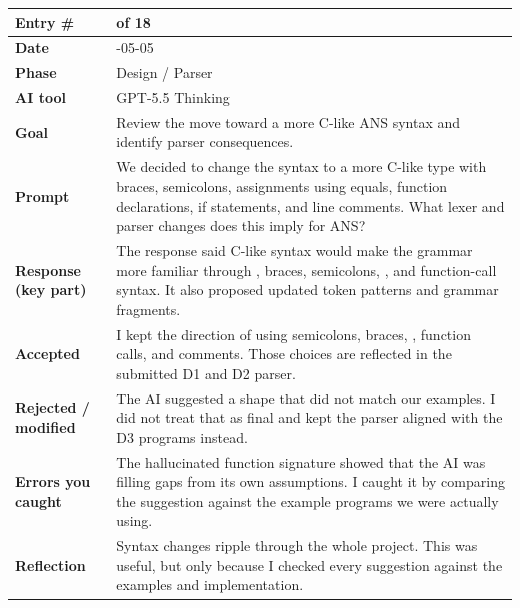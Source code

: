 \documentclass[11pt,a4paper]{article}
\newcommand{\code}[1]{\texttt{\detokenize{#1}}}
\newcommand{\entrygap}{\vspace{8pt}}
\newenvironment{journalentry}{%
  \begin{center}\small\renewcommand{\arraystretch}{1.22}%
  \begin{tabular}{|>{\columncolor{anscodebg}\bfseries}p{3.0cm}|>{\RaggedRight\arraybackslash}p{12.25cm}|}%
  \hline
}{%
  \end{tabular}\end{center}\entrygap
}
\begin{document}
\begin{journalentry}
Entry \# & 5 of 18 \\ \hline
Date & 2026-05-05 \\ \hline
Phase & Design / Parser \\ \hline
AI tool & GPT-5.5 Thinking \\ \hline
Goal & Review the move toward a more C-like ANS syntax and identify parser consequences. \\ \hline
Prompt & We decided to change the syntax to a more C-like type with braces, semicolons, assignments using equals, function declarations, if statements, and line comments. What lexer and parser changes does this imply for ANS? \\ \hline
Response (key part) & The response said C-like syntax would make the grammar more familiar through \code{let}, braces, semicolons, \code{=}, and function-call syntax. It also proposed updated token patterns and grammar fragments. \\ \hline
Accepted & I kept the direction of using semicolons, braces, \code{=}, function calls, and \code{//} comments. Those choices are reflected in the submitted D1 and D2 parser. \\ \hline
Rejected / modified & The AI suggested a \code{compute\_yield} shape that did not match our examples. I did not treat that as final and kept the parser aligned with the D3 programs instead. \\ \hline
Errors you caught & The hallucinated function signature showed that the AI was filling gaps from its own assumptions. I caught it by comparing the suggestion against the example programs we were actually using. \\ \hline
Reflection & Syntax changes ripple through the whole project. This was useful, but only because I checked every suggestion against the examples and implementation. \\ \hline
\end{journalentry}
\end{document}
